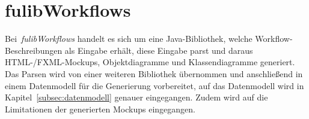 \section{fulibWorkflows}\label{sec:fulibworkflows2}
Bei~\textit{fulibWorkflows} handelt es sich um eine Java-Bibliothek, welche Workflow-Beschreibungen als Eingabe erhält, diese Eingabe
parst und daraus HTML-/FXML-Mockups, Objektdiagramme und Klassendiagramme generiert.
Das Parsen wird von einer weiteren Bibliothek übernommen und anschließend in einem Datenmodell für
die Generierung vorbereitet, auf das Datenmodell wird in Kapitel~\ref{subsec:datenmodell} genauer eingegangen.
Zudem wird auf die Limitationen der generierten Mockups eingegangen.








